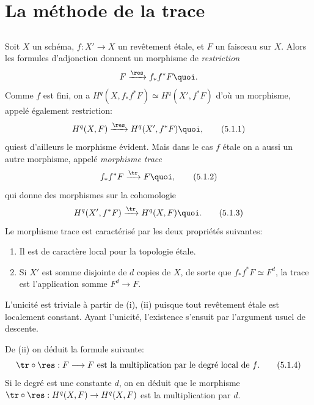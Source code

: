 \documentclass[10pt]{../fichiers-configuration-latex/smfart}
\begin{document}
\section{La méthode de la trace}

\subsection{}
Soit $X$ un schéma, $f:X'\rightarrow X$ un revêtement étale, et $F$ un
faisceau sur $X$. Alors les formules d'adjonction donnent un morphisme
de \emph{restriction}
$$
F\xrightarrow{\res}f_{\ast}f^{\ast}F{\quoi}.
$$
Comme $f$ est fini, on a $H^q(X,f_{\ast}f^{\ast}F)\simeq H^q(X',
f^{\ast}F)$ d'où un morphisme, appelé également restriction:
\begin{equation*}
H^q(X,F)\xrightarrow{\res}H^q(X',f^{\ast} F){\quoi},\tag{5.1.1}
\end{equation*}
qui\pageoriginale est d'ailleurs le morphisme évident. Mais dans le
cas $f$ étale on a aussi un autre morphisme, appelé \emph{morphisme
trace}
\begin{equation*}
f_{\ast}f^{\ast} F\xrightarrow{\tr} F{\quoi},\tag{5.1.2}
\end{equation*}
qui donne des morphismes sur la cohomologie
\begin{equation*}
H^q(X', f^{\ast} F)\xrightarrow{\tr}H^q
(X,F){\quoi}.\tag{5.1.3}
\end{equation*}
Le morphisme trace est caractérisé par les deux propriétés suivantes:
\begin{enumerate}
\renewcommand{\theenumi}{\roman{enumi}}
\renewcommand{\labelenumi}{(\theenumi)}
\item Il est de caractère local pour la topologie étale.

\item Si $X'$ est somme disjointe de $d$ copies de $X$, de sorte que
$f_{\ast}f^{\ast} F\simeq F^d$, la trace est l'application somme
$F^d\rightarrow F$.
\end{enumerate}

L'unicité est triviale à partir de (i), (ii) puisque tout revêtement
étale est localement constant. Ayant l'unicité, l'existence s'ensuit
par l'argument usuel de descente.

De (ii) on déduit la formule suivante:
\begin{equation*}
\tr\circ \res:F\longrightarrow F\mbox{ est la multiplication par le
degré local de $f$.}\tag{5.1.4}
\end{equation*}
Si le degré est une constante $d$, on en déduit que le morphisme
$\tr\circ \res: H^q(X,F)\rightarrow H^q(X,F)$ est la multiplication
par $d$.
\end{document}
